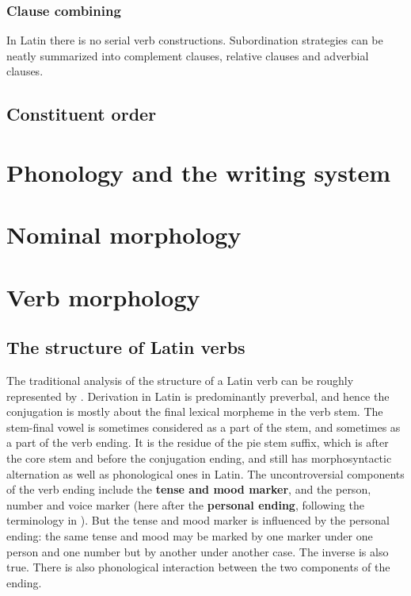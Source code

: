 \documentclass[UTF8, a4paper, oneside]{report}
\newcommand*{\citesec}[1]{\S~{#1}}
\newcommand*{\concept}[1]{\textbf{#1}}
\begin{document}
\subsection{Clause combining}\label{sec:clause-combine-abs}

In Latin there is no serial verb constructions.
Subordination strategies can be neatly summarized into 
complement clauses, relative clauses and adverbial clauses.

\section{Constituent order}\label{sec:constituent-order-abs}


\chapter{Phonology and the writing system}

\chapter{Nominal morphology}


\chapter{Verb morphology}

\section{The structure of Latin verbs}

The traditional analysis of the structure of a Latin verb 
can be roughly represented by .
Derivation in Latin is predominantly preverbal,
and hence the conjugation is mostly about the final lexical morpheme in the verb stem.
The stem-final vowel is sometimes considered as a part of the stem,
and sometimes as a part of the verb ending.
It is the residue of the \ac{pie} stem suffix, which is after the core stem and before the conjugation ending,
and still has morphosyntactic alternation as well as phonological ones in Latin. %
The uncontroversial components of the verb ending include 
the \concept{tense and mood marker},
and the person, number and voice marker 
(here after the \concept{personal ending}, 
following the terminology in \citet[\citesec{165}]{allen1903allen}).
But the tense and mood marker is influenced by the personal ending:
the same tense and mood may be marked by one marker under one person and one number
but by another under another case.
The inverse is also true.
There is also phonological interaction between the two components of the ending.
\end{document}
